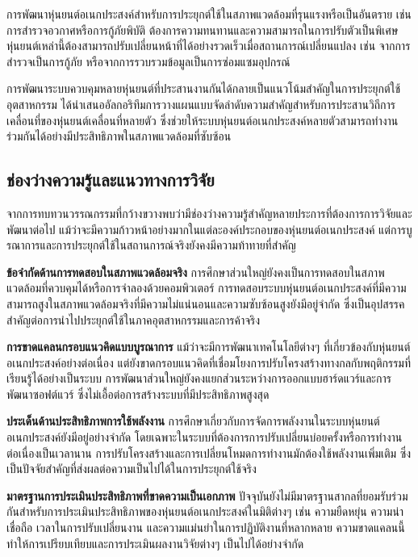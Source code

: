 \documentclass[a4paper]{article}
\begin{document}
การพัฒนาหุ่นยนต์อเนกประสงค์สำหรับการประยุกต์ใช้ในสภาพแวดล้อมที่รุนแรงหรือเป็นอันตราย เช่น การสำรวจอวกาศหรือการกู้ภัยพิบัติ ต้องการความทนทานและความสามารถในการปรับตัวเป็นพิเศษ หุ่นยนต์เหล่านี้ต้องสามารถปรับเปลี่ยนหน้าที่ได้อย่างรวดเร็วเมื่อสถานการณ์เปลี่ยนแปลง เช่น จากการสำรวจเป็นการกู้ภัย หรือจากการรวบรวมข้อมูลเป็นการซ่อมแซมอุปกรณ์

การพัฒนาระบบควบคุมหลายหุ่นยนต์ที่ประสานงานกันได้กลายเป็นแนวโน้มสำคัญในการประยุกต์ใช้อุตสาหกรรม \textcite{ieee2015prioritized} ได้นำเสนออัลกอริทึมการวางแผนแบบจัดลำดับความสำคัญสำหรับการประสานวิถีการเคลื่อนที่ของหุ่นยนต์เคลื่อนที่หลายตัว ซึ่งช่วยให้ระบบหุ่นยนต์อเนกประสงค์หลายตัวสามารถทำงานร่วมกันได้อย่างมีประสิทธิภาพในสภาพแวดล้อมที่ซับซ้อน

\subsection{ช่องว่างความรู้และแนวทางการวิจัย}

จากการทบทวนวรรณกรรมที่กว้างขวางพบว่ามีช่องว่างความรู้สำคัญหลายประการที่ต้องการการวิจัยและพัฒนาต่อไป แม้ว่าจะมีความก้าวหน้าอย่างมากในแต่ละองค์ประกอบของหุ่นยนต์อเนกประสงค์ แต่การบูรณาการและการประยุกต์ใช้ในสถานการณ์จริงยังคงมีความท้าทายที่สำคัญ

\textbf{ข้อจำกัดด้านการทดสอบในสภาพแวดล้อมจริง} การศึกษาส่วนใหญ่ยังคงเป็นการทดสอบในสภาพแวดล้อมที่ควบคุมได้หรือการจำลองด้วยคอมพิวเตอร์ การทดสอบระบบหุ่นยนต์อเนกประสงค์ที่มีความสามารถสูงในสภาพแวดล้อมจริงที่มีความไม่แน่นอนและความซับซ้อนสูงยังมีอยู่จำกัด ซึ่งเป็นอุปสรรคสำคัญต่อการนำไปประยุกต์ใช้ในภาคอุตสาหกรรมและการค้าจริง

\textbf{การขาดแคลนกรอบแนวคิดแบบบูรณาการ} แม้ว่าจะมีการพัฒนาเทคโนโลยีต่างๆ ที่เกี่ยวข้องกับหุ่นยนต์อเนกประสงค์อย่างต่อเนื่อง แต่ยังขาดกรอบแนวคิดที่เชื่อมโยงการปรับโครงสร้างทางกลกับพฤติกรรมที่เรียนรู้ได้อย่างเป็นระบบ การพัฒนาส่วนใหญ่ยังคงแยกส่วนระหว่างการออกแบบฮาร์ดแวร์และการพัฒนาซอฟต์แวร์ ซึ่งไม่เอื้อต่อการสร้างระบบที่มีประสิทธิภาพสูงสุด

\textbf{ประเด็นด้านประสิทธิภาพการใช้พลังงาน} การศึกษาเกี่ยวกับการจัดการพลังงานในระบบหุ่นยนต์อเนกประสงค์ยังมีอยู่อย่างจำกัด โดยเฉพาะในระบบที่ต้องการการปรับเปลี่ยนบ่อยครั้งหรือการทำงานต่อเนื่องเป็นเวลานาน การปรับโครงสร้างและการเปลี่ยนโหมดการทำงานมักต้องใช้พลังงานเพิ่มเติม ซึ่งเป็นปัจจัยสำคัญที่ส่งผลต่อความเป็นไปได้ในการประยุกต์ใช้จริง

\textbf{มาตรฐานการประเมินประสิทธิภาพที่ขาดความเป็นเอกภาพ} ปัจจุบันยังไม่มีมาตรฐานสากลที่ยอมรับร่วมกันสำหรับการประเมินประสิทธิภาพของหุ่นยนต์อเนกประสงค์ในมิติต่างๆ เช่น ความยืดหยุ่น ความน่าเชื่อถือ เวลาในการปรับเปลี่ยนงาน และความแม่นยำในการปฏิบัติงานที่หลากหลาย ความขาดแคลนนี้ทำให้การเปรียบเทียบและการประเมินผลงานวิจัยต่างๆ เป็นไปได้อย่างจำกัด
\end{document}
